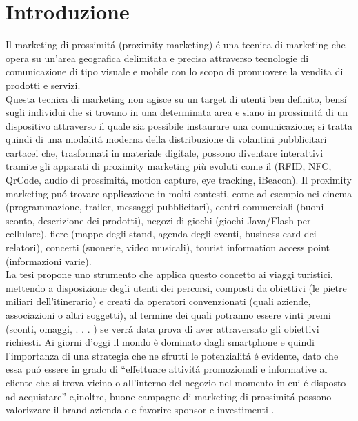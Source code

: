 \chapter*{Introduzione}
\vspace{4em}


Il marketing di prossimitá (proximity marketing) é una tecnica di marketing che opera su un'area geografica delimitata e precisa attraverso tecnologie di comunicazione di tipo visuale e mobile con lo scopo di promuovere la vendita di prodotti e servizi.\\[0.2cm]

Questa tecnica di marketing non agisce su un target di utenti ben definito, bensí sugli individui che si trovano in una determinata area e siano in prossimitá di un dispositivo attraverso il quale sia possibile instaurare una comunicazione; si tratta quindi di una modalitá moderna della distribuzione di volantini pubblicitari cartacei che, trasformati in materiale digitale, possono diventare interattivi tramite gli apparati di proximity marketing più evoluti come il (RFID, NFC, QrCode, audio di prossimitá, motion capture, eye tracking, iBeacon).
Il proximity marketing puó trovare applicazione in molti contesti, come ad esempio nei cinema (programmazione, trailer, messaggi pubblicitari), centri commerciali (buoni sconto, descrizione dei prodotti), negozi di giochi (giochi Java/Flash per cellulare), fiere (mappe degli stand, agenda degli eventi, business card dei relatori), concerti (suonerie, video musicali), tourist information access point (informazioni varie).\\[0.2cm]

La tesi propone uno strumento che applica questo concetto ai
viaggi turistici, mettendo a disposizione degli utenti dei percorsi, composti da obiettivi (le pietre miliari dell’itinerario) e creati da operatori convenzionati (quali aziende, associazioni o altri soggetti), al termine dei quali potranno essere vinti premi (sconti, omaggi, . . . ) se verrá data prova di aver attraversato gli obiettivi richiesti.
Ai giorni d'oggi il mondo è dominato dagli smartphone e quindi l'importanza di una strategia che ne sfrutti le potenzialitá é evidente, dato che essa puó essere in grado di “effettuare attivitá promozionali e informative al cliente che si trova vicino o all’interno del negozio nel momento in cui é disposto ad acquistare” \cite{rif1} e,inoltre, buone campagne di marketing di prossimitá possono valorizzare il brand aziendale e favorire sponsor e investimenti \cite{rif4}.\\[0.2cm]

